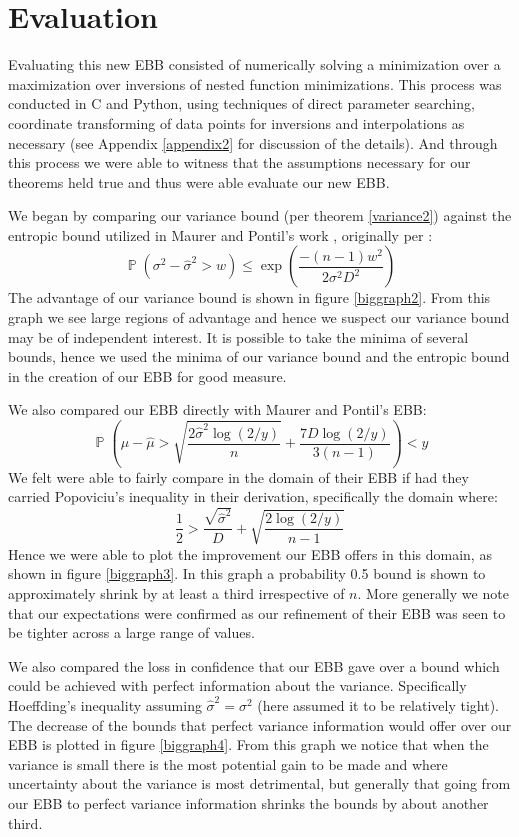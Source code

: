 \documentclass[aap,preprint]{imsart}
\DeclareMathOperator{\p}{\mathbb{P}}
\begin{document}
\section{Evaluation}\label{evaluation}
Evaluating this new EBB consisted of numerically solving a minimization over a maximization over inversions of nested function minimizations.
This process was conducted in C and Python, using techniques of direct parameter searching, coordinate transforming of data points for inversions and interpolations as necessary (see Appendix \ref{appendix2} for discussion of the details).
And through this process we were able to witness that the assumptions necessary for our theorems held true and thus were able evaluate our new EBB.

We began by comparing our variance bound (per theorem \ref{variance2}) against the entropic bound utilized in Maurer and Pontil's work \cite{Maurer50empiricalbernstein}, originally per \cite{MR2245497}:
\begin{equation}\label{eq:fe} \p(\sigma^2 - \hat{\sigma}^2>w) \le \exp\left(\frac{-(n-1)w^2}{2\sigma^2D^2}\right) \end{equation}
The advantage of our variance bound is shown in figure \ref{biggraph2}.
From this graph we see large regions of advantage and hence we suspect our variance bound may be of independent interest.
It is possible to take the minima of several bounds, hence we used the minima of our variance bound and the entropic bound in the creation of our EBB for good measure.

We also compared our EBB directly with Maurer and Pontil's EBB\cite{Maurer50empiricalbernstein}:
$$ \p\left(\mu-\hat{\mu}>\sqrt{\frac{2\hat{\sigma}^2\log(2/y)}{n}}+\frac{7D\log(2/y)}{3(n-1)}\right)<y $$
We felt were able to fairly compare in the domain of their EBB if had they carried Popoviciu's inequality in their derivation, specifically the domain where:
$$ \frac{1}{2}>\frac{\sqrt{\hat{\sigma}^2}}{D}+\sqrt{\frac{2\log(2/y)}{n-1}} $$
Hence we were able to plot the improvement our EBB offers in this domain, as shown in figure \ref{biggraph3}. In this graph a probability 0.5 bound is shown to approximately shrink by at least a third irrespective of $n$.
More generally we note that our expectations were confirmed as our refinement of their EBB was seen to be tighter across a large range of values.

We also compared the loss in confidence that our EBB gave over a bound which could be achieved with perfect information about the variance. Specifically Hoeffding's inequality assuming $\hat{\sigma}^2=\sigma^2$ (here assumed it to be relatively tight). The decrease of the bounds that perfect variance information would offer over our EBB is plotted in figure \ref{biggraph4}.
From this graph we notice that when the variance is small there is the most potential gain to be made and where uncertainty about the variance is most detrimental, but generally that going from our EBB to perfect variance information shrinks the bounds by about another third.
\end{document}

